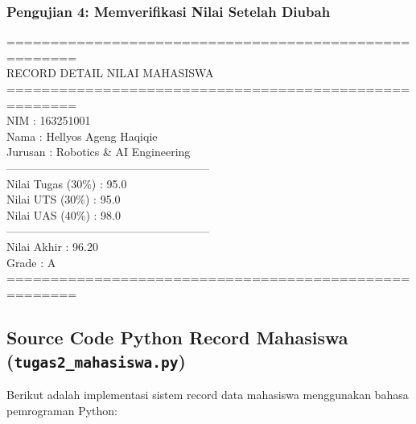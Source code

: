 \documentclass[12pt,a4paper]{article}
\begin{document}
\subsubsection{Pengujian 4: Memverifikasi Nilai Setelah Diubah}
\begin{tcolorbox}[colback=black!90!white,coltext=green!90!white,fontupper=\ttfamily\footnotesize,title=\textbf{Terminal Output: Detail Nilai Setelah Perubahan}]
======================================================\\
              RECORD DETAIL NILAI MAHASISWA           \\
======================================================\\
NIM               : 163251001\\
Nama              : Hellyos Ageng Haqiqie\\
Jurusan           : Robotics \& AI Engineering\\
------------------------------------------------------\\
Nilai Tugas (30\%) : 95.0\\
Nilai UTS (30\%)   : 95.0\\
Nilai UAS (40\%)   : 98.0\\
------------------------------------------------------\\
Nilai Akhir       : 96.20\\
Grade             : A\\
======================================================
\end{tcolorbox}

\subsection{Source Code Python Record Mahasiswa (\texttt{tugas2\_mahasiswa.py})}
Berikut adalah implementasi sistem record data mahasiswa menggunakan bahasa pemrograman Python:
\end{document}

